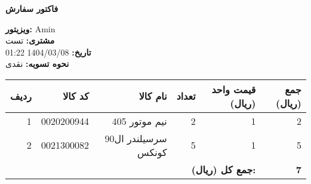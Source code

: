 \documentclass[a4paper,12pt]{article}
\begin{document}
        \begin{center}
            \textbf{\Large فاکتور سفارش}
        \end{center}
        \vspace{0.5cm}
        \begin{flushright}
            \textbf{ویزیتور:} Amin \\
            \textbf{مشتری:} تست \\
            \textbf{تاریخ:} 1404/03/08 01:22 \\
            \textbf{نحوه تسویه:} نقدی
        \end{flushright}
        \vspace{0.5cm}
        \begin{longtable}{|r|r|r|r|r|r|}
            \hline
            \textbf{ردیف} & \textbf{کد کالا} & \textbf{نام کالا} & \textbf{تعداد} & \textbf{قیمت واحد (ریال)} & \textbf{جمع (ریال)} \\
            \hline
            \endhead
                    1 & 0020200944 & نيم موتور 405 & 2 & 1 & 2 \\
            \hline
            2 & 0021300082 & سرسيلندر ال90 کونکس & 5 & 1 & 5 \\
            \hline

            \hline
            \multicolumn{5}{|r|}{\textbf{جمع کل (ریال):}} & \textbf{ 7 } \\
            \hline
        \end{longtable}
        
\end{document}
